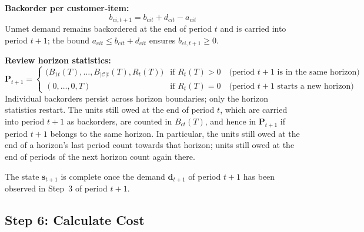\documentclass[11pt, a4paper]{article}
\theoremstyle{definition}
\theoremstyle{remark}
\begin{document}
\textbf{Backorder per customer-item:}
\begin{equation}
    b_{ci,t+1} = b_{cit} + d_{cit} - a_{cit}
\end{equation}
Unmet demand remains backordered at the end of period $t$ and is carried into period $t+1$; the bound $a_{cit} \leq b_{cit} + d_{cit}$ ensures $b_{ci,t+1} \geq 0$.

\textbf{Review horizon statistics:}
\begin{equation}
    \mathbf{P}_{t+1} = \begin{cases}
        \big(B_{1t}(T), \ldots, B_{|\mathcal{C}|t}(T), R_t(T)\big) & \text{if } R_t(T) > 0 \quad \text{(period $t+1$ is in the same horizon)} \\
        (0, \ldots, 0, T) & \text{if } R_t(T) = 0 \quad \text{(period $t+1$ starts a new horizon)}
    \end{cases}
\end{equation}
Individual backorders persist across horizon boundaries; only the horizon statistics restart. The units still owed at the end of period $t$, which are carried into period $t+1$ as backorders, are counted in $B_{ct}(T)$, and hence in $\mathbf{P}_{t+1}$ if period $t+1$ belongs to the same horizon. In particular, the units still owed at the end of a horizon's last period count towards that horizon; units still owed at the end of periods of the next horizon count again there.

The state $\mathbf{s}_{t+1}$ is complete once the demand $\mathbf{d}_{t+1}$ of period $t+1$ has been observed in Step~3 of period $t+1$.

\subsection{Step 6: Calculate Cost}
\label{sec:cost}
\end{document}
